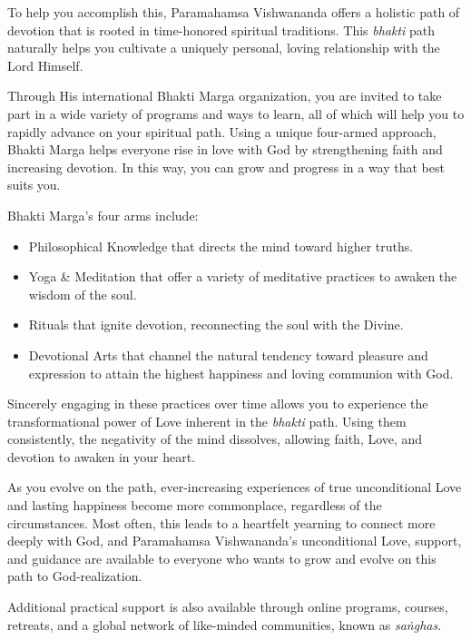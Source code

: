 \documentclass[12pt, twoside, openright]{memoir}
\begin{document}
To help you accomplish this, Paramahamsa Vishwananda offers a holistic path of devotion that is rooted in time-honored spiritual traditions. This \textit{bhakti} path naturally helps you cultivate a uniquely personal, loving relationship with the Lord Himself.

Through His international Bhakti Marga organization, you are invited to take part in a wide variety of programs and ways to learn, all of which will help you to rapidly advance on your spiritual path. Using a unique four-armed approach, Bhakti Marga helps everyone rise in love with God by strengthening faith and increasing devotion. In this way, you can grow and progress in a way that best suits you.

Bhakti Marga's four arms include:
\begin{itemize}[itemsep=1pt, topsep=6pt]

\item Philosophical Knowledge that directs the
mind toward higher truths.

\item Yoga \& Meditation that offer a variety of
meditative practices to awaken the wisdom
of the soul.

\item Rituals that ignite devotion, reconnecting the
soul with the Divine.

\item Devotional Arts that channel the natural
tendency toward pleasure and expression
to attain the highest happiness and loving
communion with God.
\end{itemize}

Sincerely engaging in these practices over time allows you to experience the transformational power of Love inherent in the \textit{bhakti} path. Using them consistently, the negativity of the mind dissolves, allowing faith, Love, and devotion to awaken in your heart.

As you evolve on the path, ever-increasing experiences of true unconditional Love and lasting happiness become more commonplace, regardless of the circumstances. Most often, this leads to a heartfelt yearning to connect more deeply with God, and Paramahamsa Vishwananda’s unconditional Love, support, and guidance are available to everyone who wants to grow and evolve on this path to God-realization.


Additional practical support is also available through online programs, courses, retreats, and a global network of like-minded communities, known as \textit{saṅghas}.
\end{document}
